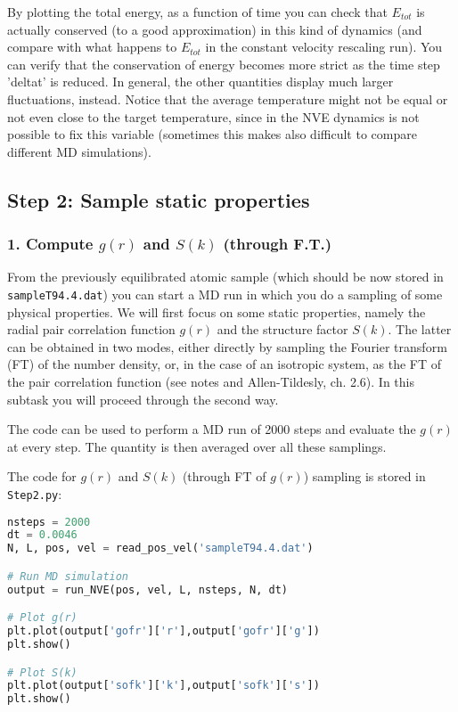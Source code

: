 \documentclass[12pt]{article}
\begin{document}
By plotting the total energy, as a function of time you can check that 
$E_{tot}$ is actually conserved (to a good approximation) in this kind of dynamics
(and compare with what happens to $E_{tot}$ in the constant velocity rescaling run).
You can verify that the conservation of energy becomes more strict as the time
step 'deltat' is reduced.
In general, the other quantities display much larger fluctuations, instead. 
Notice that the average temperature might not be equal or not even close to the
target temperature, since in the NVE dynamics is not possible to fix this
variable (sometimes this makes also difficult to compare different MD 
simulations).


\subsection*{Step 2: Sample static properties}
\subsubsection*{1. Compute $g(r)$ and $S(k)$ (through F.T.)}

From the previously equilibrated atomic sample (which should be now stored in \\
\verb!sampleT94.4.dat!) you can start a MD run in which you do a sampling
of some physical properties.
We will first focus on some static properties, namely the radial pair
correlation function $g(r)$ and the structure factor $S(k)$. The latter can be
obtained in two modes, either directly by sampling the Fourier transform (FT)
of the number density, or, in the case of an isotropic system, as the FT of
the pair correlation function (see notes and Allen-Tildesly, ch. 2.6). In this
subtask you will proceed through the second way.


The code can be used to perform a MD run of 2000
steps and evaluate the $g(r)$ at every step. The quantity is then averaged over
all these samplings.

The code for $g(r)$ and $S(k)$ (through FT of $g(r)$) sampling is stored in \verb!Step2.py!:
\begin{lstlisting}[language=python]
nsteps = 2000
dt = 0.0046
N, L, pos, vel = read_pos_vel('sampleT94.4.dat')

# Run MD simulation
output = run_NVE(pos, vel, L, nsteps, N, dt)

# Plot g(r)
plt.plot(output['gofr']['r'],output['gofr']['g'])
plt.show()

# Plot S(k)
plt.plot(output['sofk']['k'],output['sofk']['s'])
plt.show()
\end{lstlisting}
\end{document}
